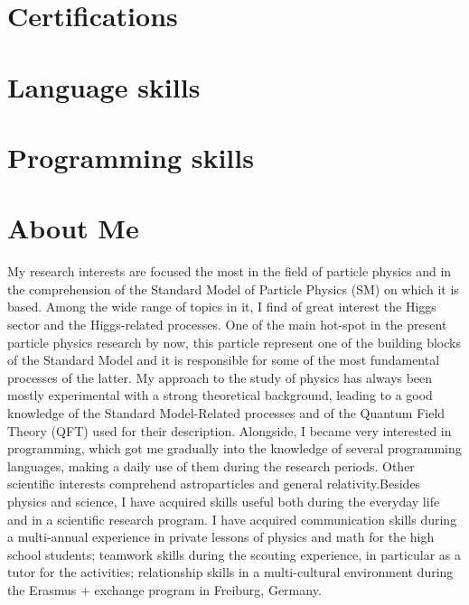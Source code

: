 \documentclass[11pt,a4paper,roman]{moderncv}        %
\begin{document}
\section{Certifications}

\section{Language skills}

\section{Programming skills}

\section{About Me}
My research interests are focused the most in the field of particle physics and in the comprehension of the Standard Model of Particle Physics (SM) on which it is based. Among the wide range of topics in it, I find of great interest the Higgs sector and the Higgs-related processes. One of the main hot-spot in the present particle physics research by now, this particle represent one of the building blocks of the Standard Model and it is responsible for some of the most fundamental processes of the latter. My approach to the study of physics has always been mostly experimental with a strong theoretical background, leading to a good knowledge of the Standard Model-Related processes and of the Quantum Field Theory (QFT) used for their description. Alongside, I became very interested in programming, which got me gradually into the knowledge of several programming languages, making a daily use of them during the research periods. Other scientific interests comprehend astroparticles and general relativity.Besides physics and science, I have acquired skills useful both during the everyday life and in a scientific research program. I have acquired communication skills during a multi-annual experience in private lessons of physics and math for the high school students; teamwork skills during the scouting experience, in particular as a tutor for the activities; relationship skills in a multi-cultural environment during the Erasmus + exchange program in Freiburg, Germany.
\end{document}
